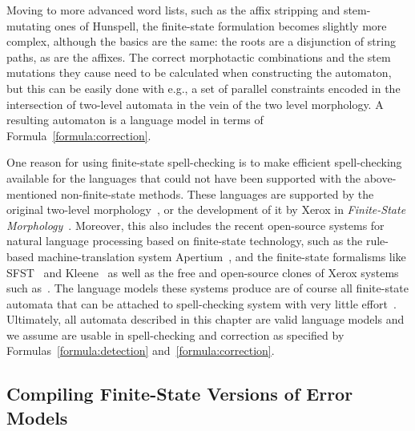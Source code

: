 \documentclass[a4paper,12pt]{article}
\begin{document}
Moving to more advanced word lists, such as the affix stripping and stem-mutating 
ones of Hunspell, the finite-state formulation becomes slightly more
complex, although the basics are the same: the roots are a disjunction of string
paths, as are the affixes. The correct morphotactic combinations and the
stem mutations they cause need to be calculated when constructing the
automaton, but this can be easily done with e.g., a set of parallel constraints
encoded in the intersection of two-level automata \cite[]{pirinen2010creating}
in the vein of the two level morphology. A resulting automaton is a language
model in terms of Formula~\ref{formula:correction}.

One reason for using finite-state spell-checking is to make efficient
spell-checking available for the languages that could not have been supported
with the above-mentioned non-finite-state methods. These languages are
supported by the original two-level morphology~\cite[]{koskenniemi/1983}, or the
development of it by Xerox in \emph{Finite-State
Morphology}~\cite[]{beesley2003finite}. Moreover, this also includes the
recent open-source systems for natural language processing based on
finite-state technology, such as the rule-based machine-translation system
Apertium~\cite[]{apertium2010}, and the finite-state formalisms like
SFST~\cite[]{schmid2006programming} and Kleene~\cite[]{beesley2012kleene} as
well as the free and open-source clones of Xerox systems
such as~\cite{conf/sfcm/Linden2009,hfst/2013,hulden2009foma}. The language models these systems
produce are of course all finite-state automata that can be attached to
spell-checking system with very little
effort~\cite[e.g.][]{pirinen2012compiling}. Ultimately, all automata described
in this chapter are valid language models and we assume are usable in
spell-checking and correction as specified by Formulas~\ref{formula:detection}
and~\ref{formula:correction}.

\subsection{Compiling Finite-State Versions of Error Models}
\label{subsec:error-models}
\end{document}
